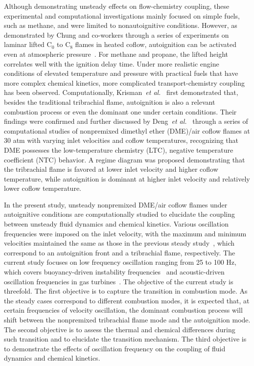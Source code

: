 \documentclass[review,3p,times]{elsarticle}
\begin{document}
Although demonstrating unsteady effects on flow-chemistry coupling, these experimental and computational investigations mainly focused on simple fuels, such as methane, and were limited to nonautoignitive conditions.  \textcolor{Rev1}{However, as demonstrated by Chung and co-workers through a series of experiments on laminar lifted C{$_0$} to C{$_8$} flames in heated coflow, autoignition can be activated even at atmospheric pressure~\cite{choi10,ainoman15}.  For methane and propane, the lifted height correlates well with the ignition delay time.}  Under more realistic engine conditions of elevated temperature and pressure with practical fuels that have more complex chemical kinetics, more complicated transport-chemistry coupling has been observed.  Computationally, Krisman~\emph{et al.}~\cite{krisman14} first demonstrated that, besides the traditional tribrachial flame, autoignition is also a relevant combustion process or even the dominant one under certain conditions.  Their findings were confirmed and further discussed by Deng~\emph{et al.}~\cite{deng15,deng15b} through a series of computational studies of nonpremixed dimethyl ether (DME)/air coflow flames at $30$ atm with varying inlet velocities and coflow temperatures, recognizing that DME possesses the low-temperature chemistry (LTC), negative temperature coefficient (NTC) behavior.  A regime diagram was proposed demonstrating that the tribrachial flame is favored at lower inlet velocity and higher coflow temperature, while autoignition is dominant at higher inlet velocity and relatively lower coflow temperature.

In the present study, unsteady nonpremixed DME/air coflow flames under autoignitive conditions are computationally studied to elucidate the coupling between unsteady fluid dynamics and chemical kinetics.  Various oscillation frequencies were imposed on the inlet velocity, with the maximum and minimum velocities maintained the same as those in the previous steady study~\cite{deng15b}, which correspond to an autoignition front and a tribrachial flame, respectively.  \textcolor{Rev1}{The current study focuses on low frequency oscillation ranging from 25 to 100 Hz, which covers buoyancy-driven instability frequencies~\cite{mohammed98,dworkin07} and acoustic-driven oscillation frequencies in gas turbines~\cite{temme12}.}  The objective of the current study is threefold.  The first objective is to capture the transition in combustion mode.  As the steady cases correspond to different combustion modes, it is expected that, at certain frequencies of velocity oscillation, the dominant combustion process will shift between the nonpremixed tribrachial flame mode and the autoignition mode.  The second objective is to assess the thermal and chemical differences during such transition and to elucidate the transition mechanism.  The third objective is to demonstrate the effects of oscillation frequency on the coupling of fluid dynamics and chemical kinetics.               
\end{document}
